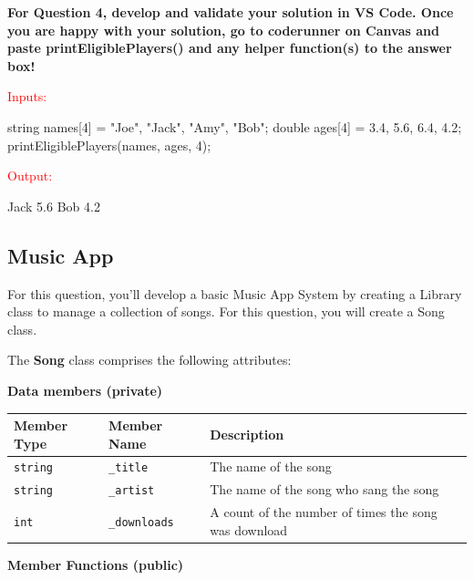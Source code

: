 \textbf{For Question 4, develop and validate your solution in VS Code. Once you are happy with your solution, go to coderunner on Canvas and paste printEligiblePlayers() and any helper function(s) to the answer box!}

\begin{sample}
\textcolor{red}{Inputs:}

string names[4] = {"Joe", "Jack", "Amy", "Bob"}; \newline
double ages[4] = {3.4, 5.6, 6.4, 4.2}; \newline
printEligiblePlayers(names, ages, 4); \newline


\textcolor{red}{Output:}

Jack 5.6 \newline
Bob 4.2

\end{sample}


\subsection{Music App} 

For this question, you'll develop a basic Music App System by creating a Library class to manage a collection of songs. For this question, you will create a Song class. 

The \textbf{Song} class comprises the following attributes:

\vspace{10pt}

\textbf{Data members (private)}

\renewcommand{\arraystretch}{1.5}
\begin{longtable}{|p{1.5in}|p{1.5in}|p{2.9in}|}
\hline
\textbf{Member Type} & \textbf{Member Name} & \textbf{Description} \\ \hline

\texttt{string} & \texttt{_title}& The name of the song\\ \hline

\texttt{string}& \texttt{_artist}& The name of the song who sang the song\\ \hline

\texttt{int} & \texttt{_downloads}& A count of the number of times the song was download\\\hline

\end{longtable}

\textbf{Member Functions (public)}

